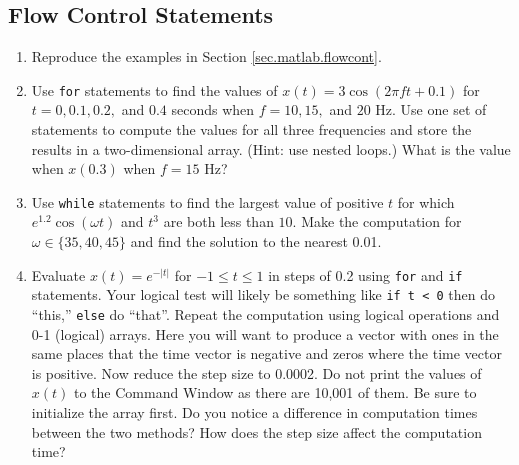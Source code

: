 \subsection{Flow Control Statements}
\begin{enumerate}
    \item Reproduce the examples in Section \ref{sec.matlab.flowcont}.
    \item Use \verb=for= statements to find the values of $x(t)= 3\cos(2\pi f t+0.1)$ for $t=0,0.1,0.2,$ and $0.4$ seconds when $f = 10, 15,$ and $20$ Hz.  Use one set of statements to compute the values for all three frequencies and store the results in a two-dimensional array.  (Hint: use nested loops.)  What is the value when $x(0.3)$ when $f=15$ Hz?
    \item Use \verb=while= statements to find the largest value of positive $t$ for which $e^{1.2}\cos(\omega t)$ and $t^3$ are both less than $10$.  Make the computation for $\omega\in\{35,40,45\}$ and find the solution to the nearest 0.01.
    \item Evaluate $x(t) = e^{-|t|}$ for $-1\leq t \leq 1$ in steps of 0.2 using \verb=for= and \verb=if= statements.  Your logical test will likely be something like \verb=if t < 0= then do ``this,'' \verb=else= do ``that''.  Repeat the computation using logical operations and 0-1 (logical) arrays.  Here you will want to produce a vector with ones in the same places that the time vector is negative and zeros where the time vector is positive.  Now reduce the step size to 0.0002.  Do not print the values of $x(t)$ to the Command Window as there are 10,001 of them.  Be sure to initialize the array first.  Do you notice a difference in computation times between the two methods?  How does the step size affect the computation time?
\end{enumerate}

